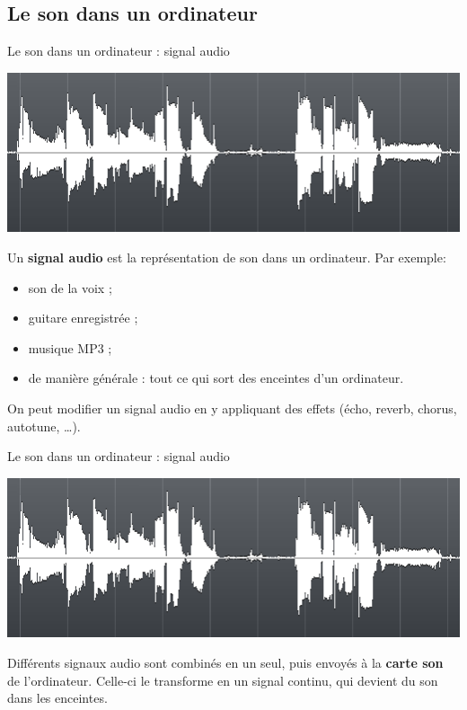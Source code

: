 \documentclass{beamer}
\begin{document}
\subsection{Le son dans un ordinateur}
\begin{frame}{Le son dans un ordinateur : signal audio}
  \begin{center}
  \includegraphics[scale=0.4]{signal_audio.png}
  \end{center}
  
  Un \textbf{signal audio} est la représentation de son dans un ordinateur. Par exemple:
  \begin{itemize}
  \item son de la voix ;
  \item guitare enregistrée ;
  \item musique MP3 ;
  \item de manière générale : tout ce qui sort des enceintes d'un ordinateur.
  \end{itemize}
  On peut modifier un signal audio en y appliquant des effets (écho, reverb, chorus, autotune, \dots).
\end{frame}
\begin{frame}{Le son dans un ordinateur : signal audio}
  \begin{center}
  \includegraphics[scale=0.4]{signal_audio.png}
  \end{center}
  
  Différents signaux audio sont combinés en un seul, puis envoyés à la \textbf{carte son} de l'ordinateur. Celle-ci le transforme en un signal continu, qui devient du son dans les enceintes.
\end{frame}
\end{document}
